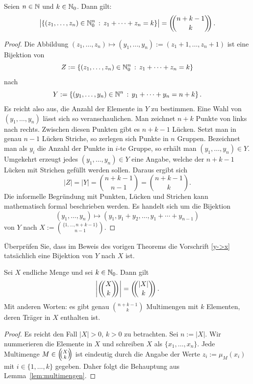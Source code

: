 \begin{lem} \label{lem:multimengen}
	Seien $n \in \mathbb{N}$ und $k \in \mathbb{N}_0$. Dann gilt: 
	\[
		\bigl| \left\{  (z_1,\ldots,z_n) \in \mathbb{N}_0^n \,:\, z_1 + \cdots + z_n = k \right\} \bigr| = \left(\!\!\binom{n+k-1}{k}\!\!\right). 
	\]
\end{lem} 
\begin{proof} 
	Die Abbildung $(z_1,\ldots,z_n) \mapsto (y_1,\ldots,y_n):=(z_1+1,\ldots,z_n+1)$ ist eine Bijektion von 
	\[
			Z:=\left\{  (z_1,\ldots,z_n) \in \mathbb{N}_0^n \,:\, z_1 + \cdots + z_n = k \right\}
	\]
	nach 
	\[
			Y:= \left\{  (y_1,\ldots,y_n) \in \mathbb{N}^n \,:\, y_1 + \cdots + y_n = n+ k \right\}. 
	\]
	Es reicht also aus, die Anzahl der Elemente in $Y$ zu bestimmen. Eine Wahl von $(y_1,\ldots,y_n)$ lässt sich so veranschaulichen. Man zeichnet $n+k$ Punkte von links nach rechts. Zwischen diesen Punkten gibt es $n+k-1$ Lücken. Setzt man in genau $n-1$ Lücken Striche, so zerlegen sich Punkte in $n$ Gruppen. Bezeichnet man als $y_i$ die Anzahl der Punkte in $i$-te Gruppe, so erhält man $(y_1,\ldots,y_n) \in Y$. Umgekehrt erzeugt jedes $(y_1,\ldots,y_n) \in Y$ eine Angabe, welche der $n+k-1$ Lücken mit Strichen gefüllt werden sollen. Daraus ergibt sich 
	\[
			|Z| = |Y|= \binom{n+k-1}{n-1} = \binom{n+k-1}{k}. 
	\]
	Die informelle Begründung mit Punkten, Lücken und Strichen kann mathematisch formal beschrieben werden. Es handelt sich um die Bijektion 
	\begin{equation}\label{y->x}
		(y_1,\ldots,y_n) \mapsto (y_1,y_1+y_2,\ldots, y_1+ \cdots +y_{n-1})
	\end{equation}
	 von $Y$ nach 
	\(
			X:=\binom{\{1,\ldots,n+k-1\}}{n-1}. 
	\)
\end{proof} 

\begin{aufg}
	Überprüfen Sie, dass im Beweis des vorigen Theorems die Vorschrift \eqref{y->x} tatsächlich eine Bijektion von $Y$ nach $X$ ist. 
\end{aufg} 

\begin{thm}
	Sei $X$ endliche Menge und sei $k \in \mathbb{N}_0$. Dann gilt 
	\[
			\left| \mbinom{X}{k} \right| = \mbinom{|X|}{k}. 
	\]
	Mit anderen Worten: es gibt genau $\binom{n+k-1}{k}$ Multimengen mit $k$ Elementen, deren Träger in $X$ enthalten ist. 
\end{thm}
\begin{proof}
	Es reicht den Fall $|X| >0$, $k>0$ zu betrachten. Sei $n:= |X|$. Wir nummerieren die Elemente in $X$ und schreiben $X$ als $\{x_1,\ldots,x_n\}$. Jede Multimenge $M \in \left(\!\!\binom{X}{k}\!\!\right)$ ist eindeutig durch die Angabe der Werte $z_i := \mu_M(x_i)$ mit $i \in \{1,\ldots,k\}$ gegeben. Daher folgt die Behauptung aus Lemma~\ref{lem:multimengen}. 
\end{proof} 

